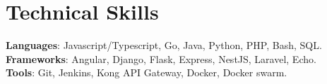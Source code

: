 \section{Technical Skills}
    \begin{itemize}[leftmargin=0.15in, label={}]
	\small{\item{
		\textbf{Languages}{: Javascript/Typescript, Go, Java, Python, PHP, Bash, SQL. } \\
		\textbf{Frameworks}{: Angular, Django, Flask, Express, NestJS, Laravel, Echo. } \\
		\textbf{Tools}{: Git, Jenkins, Kong API Gateway, Docker, Docker swarm. }
	}}
    \end{itemize}
